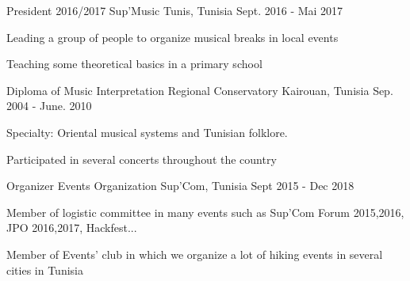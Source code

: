 

\begin{cventries}

  \cventry
    {President 2016/2017} %
    {Sup'Music} %
    {Tunis, Tunisia } %
    {Sept. 2016 - Mai 2017} %
    {
      \begin{cvitems} %
        \item {Leading a group of people to organize musical breaks in local events}
        \item {Teaching some theoretical basics in a primary school }
      \end{cvitems}
    }

  \cventry
    {Diploma of Music Interpretation} %
    {Regional Conservatory} %
    {Kairouan, Tunisia} %
    {Sep. 2004 - June. 2010} %
    {
      \begin{cvitems} %
        \item {Specialty: Oriental musical systems and Tunisian folklore.}
        \item {Participated in several concerts throughout the country}
      \end{cvitems}
    }

 \cventry
    {Organizer} %
    {Events Organization} %
    {Sup'Com, Tunisia} %
    {Sept 2015 - Dec 2018} %
    {
      \begin{cvitems} %
        \item {Member of logistic committee in many events such as Sup'Com Forum 2015,2016, JPO 2016,2017, Hackfest... }
        \item {Member of Events' club in which we organize a lot of hiking events in several cities in Tunisia}
      \end{cvitems}
    }



\end{cventries}
